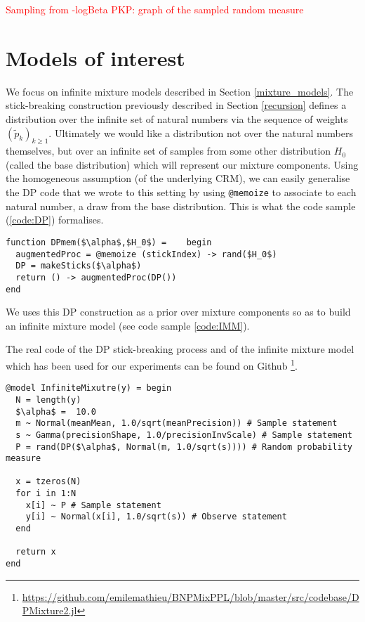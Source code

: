 \textcolor{red}{Sampling from -logBeta PKP: graph of the sampled random measure}

\section{Models of interest}
We focus on infinite mixture models described in Section \ref{mixture_models}.
The stick-breaking construction previously described in Section \ref{recursion} defines a distribution over the infinite set of natural numbers via the sequence of weights $(\tilde{p}_k)_{k \ge 1}$. Ultimately we would like a distribution not over the natural numbers themselves, but over an infinite set of samples from some other distribution $H_0$ (called the base distribution) which will represent our mixture components. Using the homogeneous assumption (of the underlying \gls{CRM}), we can easily generalise the \gls{DP} code that we wrote to this setting by using \texttt{@memoize} to associate to each natural number, a draw from the base distribution.
This is what the code sample (\ref{code:DP}) formalises.

\begin{lstlisting}[caption={\acrlong{DP} with base distribution $H_0$ written in Julia.},captionpos=b,label=code:DP]
function DPmem($\alpha$,$H_0$) =    begin
  augmentedProc = @memoize (stickIndex) -> rand($H_0$)
  DP = makeSticks($\alpha$)
  return () -> augmentedProc(DP())
end
\end{lstlisting}

We uses this \gls{DP} construction as a prior over mixture components so as to build an infinite mixture model (see code sample \ref{code:IMM}).

The real code of the \gls{DP} stick-breaking process and of the infinite mixture model which has been used for our experiments can be found on Github \footnote{\url{https://github.com/emilemathieu/BNPMixPPL/blob/master/src/codebase/DPMixture2.jl}}.

\begin{lstlisting}[caption={Nonconjugate infinite mixture model written in Turing.jl.},captionpos=b,label=code:IMM]
@model InfiniteMixutre(y) = begin
  N = length(y)
  $\alpha$ =  10.0
  m ~ Normal(meanMean, 1.0/sqrt(meanPrecision)) # Sample statement
  s ~ Gamma(precisionShape, 1.0/precisionInvScale) # Sample statement
  P = rand(DP($\alpha$, Normal(m, 1.0/sqrt(s)))) # Random probability measure

  x = tzeros(N)
  for i in 1:N
    x[i] ~ P # Sample statement
    y[i] ~ Normal(x[i], 1.0/sqrt(s)) # Observe statement
  end

  return x
end
\end{lstlisting}

